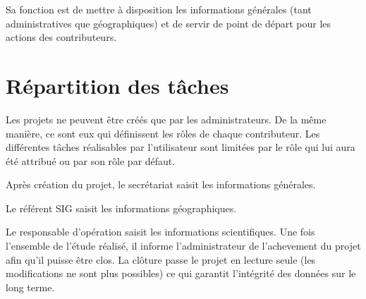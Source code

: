 \documentclass[letterpaper,10pt,french]{sphinxmanual}
\begin{document}
Sa fonction est de mettre à disposition les informations générales (tant administratives que géographiques) et de servir de point de départ pour les actions des contributeurs.
\begin{figure}[htbp]
\centering

\end{figure}


\section{Répartition des tâches}
\label{manuel/formulaire_projet:projet-taches}\label{manuel/formulaire_projet:repartition-des-taches}
Les projets ne peuvent être créés que par les administrateurs. De la même manière, ce sont eux qui définissent les rôles de chaque  contributeur. Les différentes tâches réalisables par l'utilisateur sont limitées par le rôle qui lui aura été attribué ou par son rôle par défaut.

Après création du projet, le secrétariat saisit les informations générales.

Le référent SIG saisit les informations géographiques.

Le responsable d'opération saisit les informations scientifiques. Une fois l'ensemble de l'étude réalisé, il informe l'administrateur de l'achevement du projet afin qu'il puisse être clos. La clôture passe le projet en lecture seule (les modifications ne sont plus possibles) ce qui garantit l'intégrité des données sur le long terme.
\end{document}
